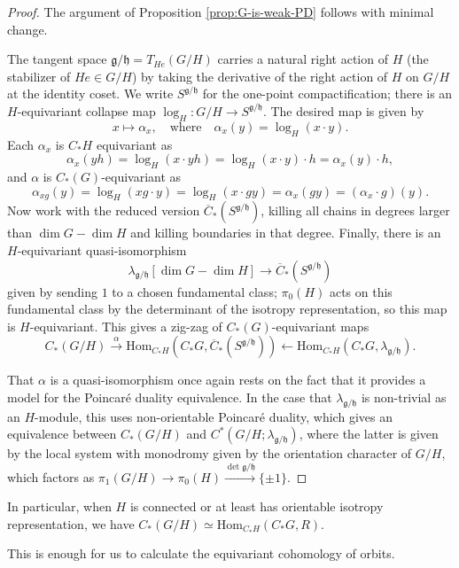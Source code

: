 \documentclass{memo-l}
\theoremstyle{definition}
\theoremstyle{remark}
\numberwithin{section}{chapter}
\numberwithin{equation}{chapter}
\begin{document}
\begin{proof}
The argument of Proposition \ref{prop:G-is-weak-PD} follows with minimal change. 

The tangent space $\mathfrak g/\mathfrak h = T_{He}(G/H)$ carries a natural right action of $H$ (the stabilizer of $He \in G/H$) by taking the derivative of the right action of $H$ on $G/H$ at the identity coset. We write $S^{\mathfrak g/\mathfrak h}$ for the one-point compactification; there is an $H$-equivariant collapse map $\log_H: G/H \to S^{\mathfrak g/\mathfrak h}$. The desired map is given by $$x \mapsto \alpha_x, \quad \text{where}\quad \alpha_x(y) = \log_H(x \cdot y).$$ Each $\alpha_x$ is $C_* H$ equivariant as $$\alpha_x(yh) = \log_H(x \cdot yh) = \log_H(x \cdot y) \cdot h = \alpha_x(y) \cdot h,$$ and $\alpha$ is $C_*(G)$-equivariant as $$\alpha_{xg}(y) = \log_H(xg \cdot y) = \log_H(x \cdot gy) = \alpha_x(gy) = (\alpha_x \cdot g)(y).$$ Now work with the reduced version $\overline C_*(S^{\mathfrak g/\mathfrak h})$, killing all chains in degrees larger than $\dim G - \dim H$ and killing boundaries in that degree. Finally, there is an $H$-equivariant quasi-isomorphism $$\lambda_{\mathfrak g/\mathfrak h}[\dim G - \dim H] \to \overline C_*(S^{\mathfrak g/\mathfrak h})$$ given by sending $1$ to a chosen fundamental class; $\pi_0(H)$ acts on this fundamental class by the determinant of the isotropy representation, so this map is $H$-equivariant. This gives a zig-zag of $C_*(G)$-equivariant maps $$C_*(G/H) \xrightarrow{\alpha} \text{Hom}_{C_* H}(C_* G, \overline C_*(S^{\mathfrak g/\mathfrak h})) \leftarrow \text{Hom}_{C_* H}(C_* G, \lambda_{\mathfrak g/\mathfrak h}).$$

That $\alpha$ is a quasi-isomorphism once again rests on the fact that it provides a model for the Poincar\'e duality equivalence. In the case that $\lambda_{\mathfrak g/\mathfrak h}$ is non-trivial as an $H$-module, this uses non-orientable Poincar\'e duality, which gives an equivalence between $C_*(G/H)$ and $C^*(G/H; \lambda_{\mathfrak g/\mathfrak h})$, where the latter is given by the local system with monodromy given by the orientation character of $G/H$, which factors as $\pi_1(G/H) \to \pi_0(H) \xrightarrow{\det \mathfrak g/\mathfrak h} \{\pm 1\}$. 
\end{proof}

In particular, when $H$ is connected or at least has orientable isotropy representation, we have $C_*(G/H) \simeq \text{Hom}_{C_* H}(C_* G, R)$. 

This is enough for us to calculate the equivariant cohomology of orbits.
\end{document}
